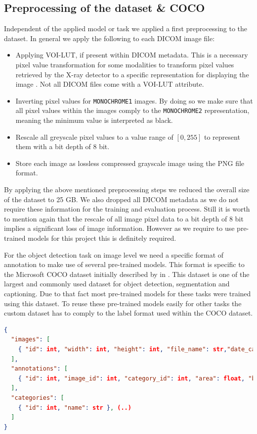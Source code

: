 \subsection*{Preprocessing of the dataset \& COCO}
Independent of the applied model or task we applied a first preprocessing to the dataset. In general we apply the following to each DICOM image file:
\begin{itemize}
	\item Applying VOI-LUT, if present within DICOM metadata. This is a necessary pixel value transformation for some modalities to transform pixel values retrieved by the X-ray detector to a specific representation for displaying the image \autocite{dicom2018}. Not all DICOM files come with a VOI-LUT attribute.
	\item Inverting pixel values for \texttt{MONOCHROME1} images. By doing so we make sure that all pixel values within the images comply to the \texttt{MONOCHROME2} representation, meaning the minimum value is interpreted as black.
	\item Rescale all greyscale pixel values to a value range of $[0,255]$ to represent them with a bit depth of 8 bit.
	\item Store each image as lossless compressed grayscale image using the \ac{PNG} file format.
\end{itemize}

By applying the above mentioned preprocessing steps we reduced the overall size of the dataset to 25 GB. We also dropped all DICOM metadata as we do not require these information for the training and evaluation process. Still it is worth to mention again that the rescale of all image pixel data to a bit depth of 8 bit implies a significant loss of image information. However as we require to use pre-trained models for this project this is definitely required.

For the object detection task on image level we need a specific format of annotation to make use of several pre-trained models. This format is specific to the Microsoft \ac{COCO} dataset initially described by \citeauthor{lin_microsoft_2015} in \citeyear{lin_microsoft_2015}. This dataset is one of the largest and commonly used dataset for object detection, segmentation and captioning. Due to that fact most pre-trained models for these tasks were trained using this dataset. To reuse these pre-trained models easily for other tasks the custom dataset has to comply to the label format used within the \ac{COCO} dataset.


\begin{minipage}{\linewidth}
	\begin{lstlisting}[language=json,firstnumber=1, caption={Basic COCO annotation format in \autocite{lin_microsoft_2015}}, captionpos=b, label={lst:coco-sample}]
{
  "images": [
    { "id": int, "width": int, "height": int, "file_name": str,"date_captured": datetime }, (..)
  ], 
  "annotations": [
    { "id": int, "image_id": int, "category_id": int, "area": float, "bbox": [x,y,width,height] }, (..)
  ],
  "categories": [
    { "id": int, "name": str }, (..)
  ]
}
	\end{lstlisting}
\end{minipage}

